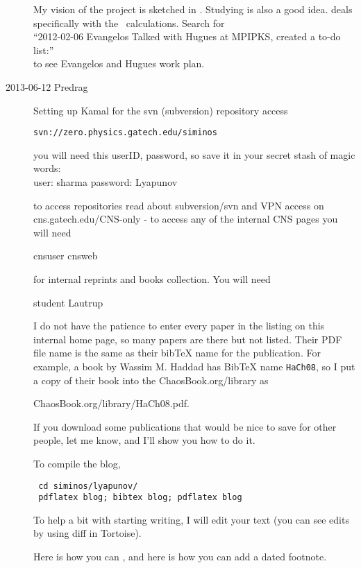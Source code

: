 \begin{description}
My vision of the project is sketched in . Studying  is also a good idea.
 deals specifically with the \KS\ calculations.
Search for\\
``2012-02-06 Evangelos Talked with Hugues at MPIPKS, created a to-do list:''
\\
to see Evangelos and Hugues work plan.

\item[2013-06-12 Predrag]
Setting up Kamal for the svn (subversion) repository access

\texttt{svn://zero.physics.gatech.edu/siminos}

you will
need this userID, password, so save it in your secret stash of magic
words:
\\
user: sharma  password: Lyapunov

to access repositories read about subversion/svn and VPN access
on
 {cns.gatech.edu/CNS-only} - to access any
of the internal CNS pages you will need

cnsuser           cnsweb

 for internal reprints and
books collection. You will need

student           Lautrup

I do not have the patience to enter every paper in the listing on this
internal home page, so many papers are there but not listed. Their PDF file
name is the same as their bibTeX name for the publication. For example, a
book by Wassim M. Haddad has BibTeX name
\texttt{HaCh08}, so I put a copy of their book into the
ChaosBook.org/library as

{ChaosBook.org/library/HaCh08.pdf}.

If you download some publications that would be nice to save for other
people, let me know, and I'll show you how to do it.

To compile the blog,
\begin{verbatim}
 cd siminos/lyapunov/
 pdflatex blog; bibtex blog; pdflatex blog
\end{verbatim}

To help a bit with starting writing, I will
edit your text (you can see edits by using diff in Tortoise).

Here is how you can
, and here is how you can add a dated
footnote.


\end{description}
